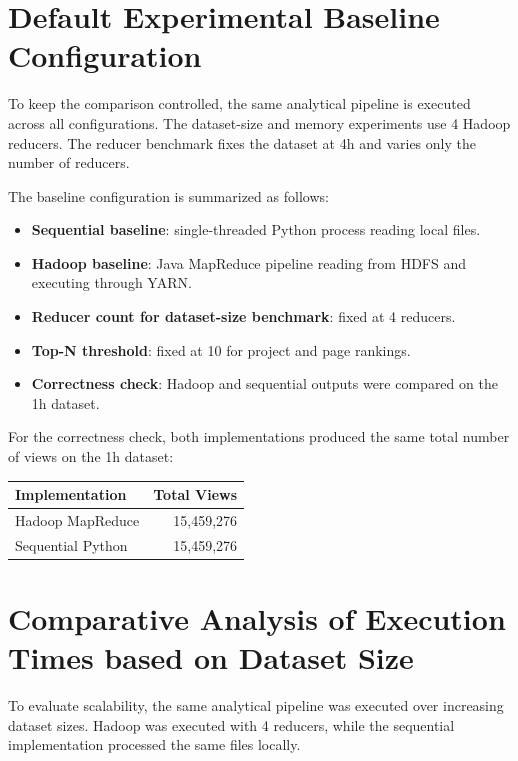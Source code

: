 \documentclass[12pt,a4paper]{report}
\begin{document}
\section{Default Experimental Baseline Configuration}

To keep the comparison controlled, the same analytical pipeline is executed across all configurations. The dataset-size and memory experiments use 4 Hadoop reducers. The reducer benchmark fixes the dataset at 4h and varies only the number of reducers.

The baseline configuration is summarized as follows:

\begin{itemize}
    \item \textbf{Sequential baseline}: single-threaded Python process reading local files.
    \item \textbf{Hadoop baseline}: Java MapReduce pipeline reading from HDFS and executing through YARN.
    \item \textbf{Reducer count for dataset-size benchmark}: fixed at 4 reducers.
    \item \textbf{Top-N threshold}: fixed at 10 for project and page rankings.
    \item \textbf{Correctness check}: Hadoop and sequential outputs were compared on the 1h dataset.
\end{itemize}

For the correctness check, both implementations produced the same total number of views on the 1h dataset:

\begin{center}
\begin{tabular}{lr}
\toprule
Implementation & Total Views \\
\midrule
Hadoop MapReduce & 15,459,276 \\
Sequential Python & 15,459,276 \\
\bottomrule
\end{tabular}
\end{center}

\section{Comparative Analysis of Execution Times based on Dataset Size}

To evaluate scalability, the same analytical pipeline was executed over increasing dataset sizes. Hadoop was executed with 4 reducers, while the sequential implementation processed the same files locally.
\end{document}
